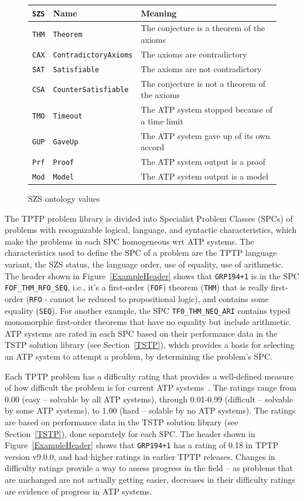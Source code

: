 \documentclass[runningheads]{llncs}
\begin{document}
\begin{figure}[htb]
\centering
\begin{tabular}{lll}
{\tt SZS} & Name                      & Meaning \\
\hline
{\tt THM} & {\tt Theorem}             & The conjecture is a theorem of the axioms \\
{\tt CAX} & {\tt ContradictoryAxioms} & The axioms are contradictory \\
{\tt SAT} & {\tt Satisfiable}         & The axioms are not contradictory \\
{\tt CSA} & {\tt CounterSatisfiable}  & The conjecture is not a theorem of the axioms \\
{\tt TMO} & {\tt Timeout}             & The ATP system stopped because of a time limit \\
{\tt GUP} & {\tt GaveUp}              & The ATP system gave up of its own accord \\
{\tt Prf} & {\tt Proof}               & The ATP system output is a proof \\
{\tt Mod} & {\tt Model}               & The ATP system output is a model \\
\end{tabular}
\caption{SZS ontology values}
\label{SZSTable}
\end{figure} 

The TPTP problem library is divided into Specialist Problem Classes (SPCs) of problems with 
recognizable logical, language, and syntactic characteristics, which make the problems in each 
SPC homogeneous wrt ATP systems.
The characteristics used to define the SPC of a problem are the TPTP language variant, the SZS
status, the language order, use of equality, use of arithmetic.
The header shown in Figure~\ref{ExampleHeader} shows that {\tt GRP194+1} is in the 
SPC {\tt FOF\_THM\_RFO\_SEQ}, i.e., it's a first-order ({\tt FOF}) theorem ({\tt THM}) that
is really first-order ({\tt RFO} - cannot be reduced to propositional logic), and contains some
equality ({\tt SEQ}).
For another example, the SPC {\tt TF0\_THM\_NEQ\_ARI} contains typed monomorphic first-order 
theorems that have no equality but include arithmetic.
ATP systems are rated in each SPC based on their performance data in the TSTP solution library 
(see Section~\ref{TSTP}), which provides a basis for selecting an ATP system to attempt a problem,
by determining the problem's SPC.

Each TPTP problem has a difficulty rating that provides a well-defined measure of how difficult 
the problem is for current ATP systems~\cite{SS01}.
The ratings range from 0.00 (easy -- solvable by all ATP systems), through 0.01-0.99 (difficult -- 
solvable by some ATP systems), to 1.00 (hard -- solable by no ATP systems).
The ratings are based on performance data in the TSTP solution library (see Section~\ref{TSTP}), 
done separately for each SPC.
The header shown in Figure~\ref{ExampleHeader} shows that {\tt GRP194+1} has a rating of 0.18 in
TPTP version v9.0.0, and had higher ratings in earlier TPTP releases.
Changes in difficulty ratings provide a way to assess progress in the field -- as problems that 
are unchanged are not actually getting easier, decreases in their difficulty ratings are evidence 
of progress in ATP systems.
\end{document}
